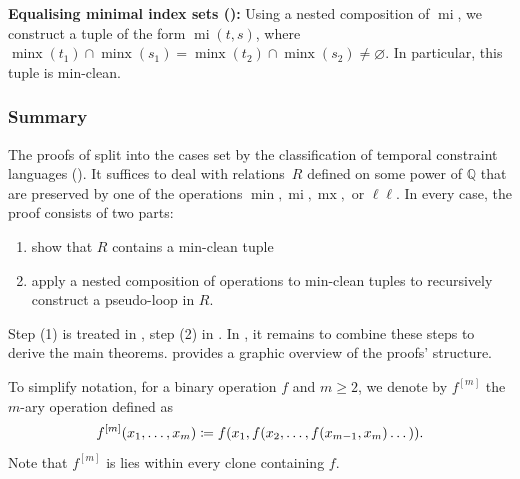 \documentclass[a4paper,reqno, cleveref]{amsart}
\newcommand{\coloneqq}{\mathrel{\mathop:}\mathrel{\mkern-1.2mu}=}
\newcommand{\Q}{\mathbb{Q}}
\newcommand{\tup}{t}
\DeclareMathOperator{\mx}{mx}
\DeclareMathOperator{\mi}{mi}
\DeclareMathOperator{\minx}{minx}
\newcommand{\nested}[2]{{#1^{[#2]}}}
\begin{document}
\textbf{Equalising minimal index sets ():} Using a nested composition of $\mi$, we construct a tuple  of the form $\mi(\tup,s)$, where $\minx(\tup_1)\cap \minx(s_1)=\minx(\tup_2)\cap\minx(s_2)\neq\varnothing$. In particular, this tuple is min-clean. 


\subsubsection{Summary}
The proofs of  split into the cases set by the classification of temporal constraint languages (). It suffices to deal with relations~$R$ defined on some power of $\Q$ that are preserved by one of the operations $\min, \mi, \mx,$ or $\ell \ell$. In every case, the proof consists of two parts: \begin{enumerate}
    \item show that $R$ contains a min-clean tuple
    \item apply a nested composition of operations to min-clean tuples to recursively construct a pseudo-loop in $R$. 
\end{enumerate}
Step (1) is treated in , step (2) in . In , it remains to combine these steps to derive the main theorems. 
 provides a graphic overview of the proofs' structure. 

To simplify notation, for a binary operation $f$ and $m\geq 2$, we denote by $\nested{f}{m}$ the $m$-ary operation defined as \[\nested{f}{m}(x_1,\dots,x_m)\coloneqq f(x_1,f(x_2,\dots,f(x_{m-1},x_m)\dots)).\] Note that $\nested{f}{m}$ is lies within every clone containing $f$.
\end{document}
